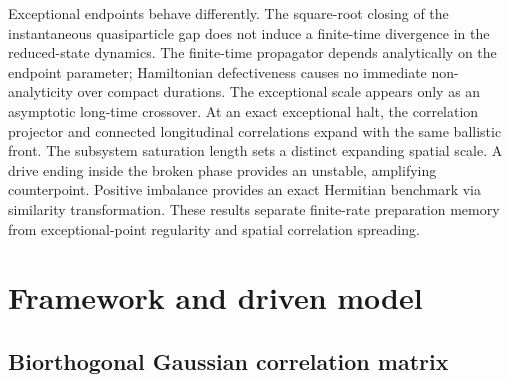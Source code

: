 \documentclass[aps,prb,reprint,superscriptaddress,amsmath,amssymb,floatfix]{revtex4-2}
\begin{document}
Exceptional endpoints behave differently.
%
The square-root closing of the instantaneous quasiparticle gap does not induce a finite-time divergence in the reduced-state dynamics. The finite-time propagator depends analytically on the endpoint parameter; Hamiltonian defectiveness causes no immediate non-analyticity over compact durations. The exceptional scale appears only as an asymptotic long-time crossover. At an exact exceptional halt, the correlation projector and connected longitudinal correlations expand with the same ballistic front. The subsystem saturation length sets a distinct expanding spatial scale. A drive ending inside the broken phase provides an unstable, amplifying counterpoint. Positive imbalance provides an exact Hermitian benchmark via similarity transformation. These results separate finite-rate preparation memory from exceptional-point regularity and spatial correlation spreading.




\section{Framework and driven model}
\label{sec:general_formalism}

\subsection{Biorthogonal Gaussian correlation matrix}
\label{sec:general_formalism:secA}
\end{document}
